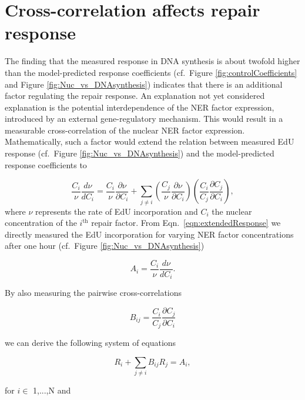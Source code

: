 \section{Cross-correlation affects repair response}
\label{sec:crossCorelResponse}
The finding that the measured response in DNA synthesis is about twofold higher than the model-predicted response coefficients (cf.\ Figure \ref{fig:controlCoefficients} and Figure \ref{fig:Nuc_vs_DNAsynthesis}) indicates that there is an additional factor regulating the repair response. An explanation not yet considered explanation is the potential interdependence of the NER factor expression, introduced by an external gene-regulatory mechanism. This would result in a measurable cross-correlation of the nuclear NER factor expression. Mathematically, such a factor would extend the relation between measured EdU response (cf.\ Figure \ref{fig:Nuc_vs_DNAsynthesis}) and the model-predicted response coefficients to 

\begin{equation}
\frac{C_i}{\nu}\frac{d \nu}{d C_i} = \frac{C_i}{\nu}\frac{\partial \nu}{\partial C_i} + \sum_{j \neq i} \left( \frac{C_j}{\nu}\frac{\partial \nu}{\partial C_i}\right) \left(\frac{C_i}{C_j}\frac{\partial C_j}{\partial C_i}\right), 
\label{eqn:extendedResponse}
\end{equation}    
where $\nu$ represents the rate of EdU incorporation and $C_i$ the nuclear concentration of the $i^{\text{th}}$ repair factor. From Eqn.\ \ref{eqn:extendedResponse} we directly measured the EdU incorporation for varying NER factor concentrations after one hour (cf.\ Figure \ref{fig:Nuc_vs_DNAsynthesis})

\begin{equation}
A_i = \frac{C_i}{\nu}\frac{d \nu}{d C_i}. \nonumber
\end{equation}

By also measuring the pairwise cross-correlations

\begin{equation}
B_{ij} = \frac{C_i}{C_j}\frac{\partial C_j}{\partial C_i} \nonumber
\end{equation}

we can derive the following system of equations


\begin{equation}
R_i + \sum_{j\neq i} B_{ij}R_j = A_i,
\label{eqn:linearEqnSystem}
\end{equation}

for $i \in$ 1,...,N and

